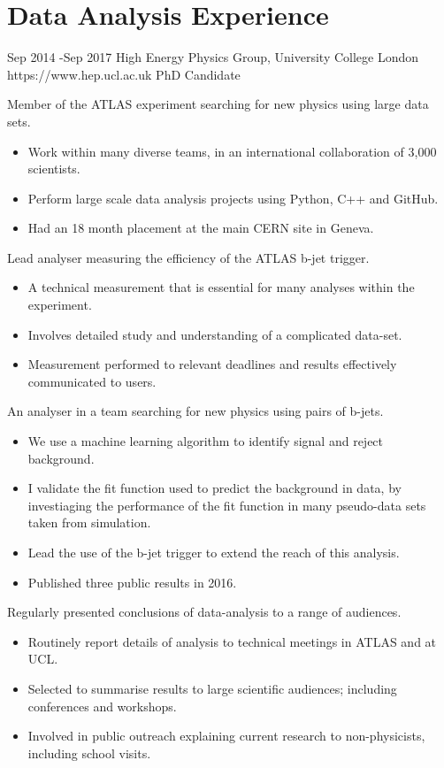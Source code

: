 \documentclass[10pt]{article} %
\begin{document}
\section{Data Analysis Experience}
\job
{Sep 2014 -}{Sep 2017}
{High Energy Physics Group, University College London}
{https://www.hep.ucl.ac.uk}
{PhD Candidate}
{
  \begin{itemize-noindent}
  \item{Member of the ATLAS experiment searching for new physics using large data sets.}
    \begin{itemize}
    \item{Work within many diverse teams, in an international collaboration of 3,000 scientists.}
    \item{Perform large scale data analysis projects using Python, C++ and GitHub.}
    \item{Had an 18 month placement at the main CERN site in Geneva.} 
    \end{itemize}
  \item{Lead analyser measuring the efficiency of the ATLAS b-jet trigger.}
    \begin{itemize}
    \item{A technical measurement that is essential for many analyses within the experiment.}
    \item{Involves detailed study and understanding of a complicated data-set.}
    \item{Measurement performed to relevant deadlines and results effectively communicated to users.}
    \end{itemize}
  \item{ An analyser in a team searching for new physics using pairs of b-jets.}
    \begin{itemize}
    \item{We use a machine learning algorithm to identify signal and reject background.}
    \item{I validate the fit function used to predict the background in data,
      by investiaging the performance of the fit function in many pseudo-data sets taken from simulation.}
    \item{Lead the use of the b-jet trigger to extend the reach of this analysis.}
    \item{Published three public results in 2016.}
    \end{itemize}
 \item{Regularly presented conclusions of data-analysis to a range of audiences.}
   \begin{itemize}
   \item{Routinely report details of analysis to technical meetings in ATLAS and at UCL.}
   \item{Selected to summarise results to large scientific audiences; including conferences and workshops.}
   \item{Involved in public outreach explaining current research to non-physicists, including school visits.}
   \end{itemize}
 \end{itemize-noindent}
}
\end{document}
